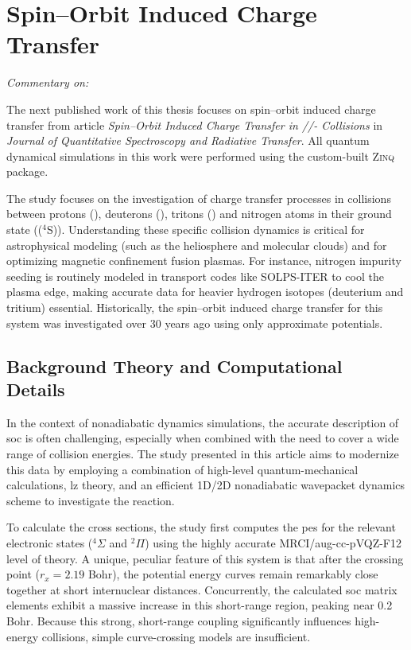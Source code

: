 \section{Spin--Orbit Induced Charge Transfer}\label{sec:spin_orbit_induced_charge_transfer}
\textit{Commentary on: }

The next published work of this thesis focuses on spin--orbit induced charge transfer from article \textit{Spin--Orbit Induced Charge Transfer in //- Collisions} in \textit{Journal of Quantitative Spectroscopy and Radiative Transfer}. All quantum dynamical simulations in this work were performed using the custom-built \textsc{Zinq} package.\supercite{10.5281/zenodo.18386143}

The study focuses on the investigation of charge transfer processes in collisions between protons (), deuterons (), tritons () and nitrogen atoms in their ground state (($^4$S)). Understanding these specific collision dynamics is critical for astrophysical modeling (such as the heliosphere and molecular clouds) and for optimizing magnetic confinement fusion plasmas. For instance, nitrogen impurity seeding is routinely modeled in transport codes like SOLPS-ITER to cool the plasma edge, making accurate data for heavier hydrogen isotopes (deuterium and tritium) essential. Historically, the spin--orbit induced charge transfer for this system was investigated over 30 years ago using only approximate potentials.
\subsection{Background Theory and Computational Details}
In the context of nonadiabatic dynamics simulations, the accurate description of \gls{soc} is often challenging, especially when combined with the need to cover a wide range of collision energies. The study presented in this article aims to modernize this data by employing a combination of high-level quantum-mechanical calculations, \gls{lz} theory, and an efficient 1D/2D nonadiabatic wavepacket dynamics scheme to investigate the  reaction.

To calculate the cross sections, the study first computes the \gls{pes} for the relevant electronic states ($^4\Sigma$ and $^2\Pi$) using the highly accurate MRCI/aug-cc-pVQZ-F12 level of theory. A unique, peculiar feature of this system is that after the crossing point ($r_x=2.19$ Bohr), the potential energy curves remain remarkably close together at short internuclear distances. Concurrently, the calculated \gls{soc} matrix elements exhibit a massive increase in this short-range region, peaking near 0.2 Bohr. Because this strong, short-range coupling significantly influences high-energy collisions, simple curve-crossing models are insufficient.


